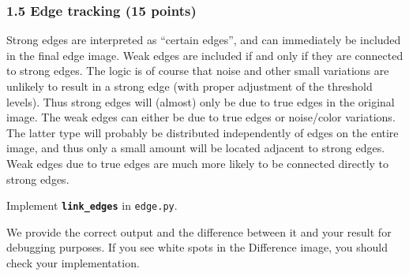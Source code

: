 \documentclass[11pt]{article}
\begin{document}
    \hypertarget{edge-tracking-15-points}{%
\subsubsection{1.5 Edge tracking (15
points)}\label{edge-tracking-15-points}}

Strong edges are interpreted as ``certain edges'', and can immediately
be included in the final edge image. Weak edges are included if and only
if they are connected to strong edges. The logic is of course that noise
and other small variations are unlikely to result in a strong edge (with
proper adjustment of the threshold levels). Thus strong edges will
(almost) only be due to true edges in the original image. The weak edges
can either be due to true edges or noise/color variations. The latter
type will probably be distributed independently of edges on the entire
image, and thus only a small amount will be located adjacent to strong
edges. Weak edges due to true edges are much more likely to be connected
directly to strong edges.

Implement \textbf{\texttt{link\_edges}} in \texttt{edge.py}.

We provide the correct output and the difference between it and your
result for debugging purposes. If you see white spots in the Difference
image, you should check your implementation.
\end{document}

